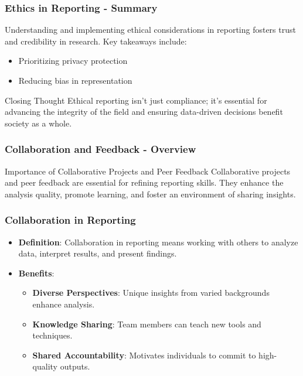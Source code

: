 \documentclass{beamer}
\begin{document}
\begin{frame}[fragile]
    \frametitle{Ethics in Reporting - Summary}
    Understanding and implementing ethical considerations in reporting fosters trust and credibility in research. 
    Key takeaways include:
    \begin{itemize}
        \item Prioritizing privacy protection
        \item Reducing bias in representation
    \end{itemize}
    \begin{block}{Closing Thought}
        Ethical reporting isn't just compliance; it's essential for advancing the integrity of the field and ensuring data-driven decisions benefit society as a whole.
    \end{block}
\end{frame}

\begin{frame}[fragile]
    \frametitle{Collaboration and Feedback - Overview}
    \begin{block}{Importance of Collaborative Projects and Peer Feedback}
        Collaborative projects and peer feedback are essential for refining reporting skills. They enhance the analysis quality, promote learning, and foster an environment of sharing insights.
    \end{block}
\end{frame}

\begin{frame}[fragile]
    \frametitle{Collaboration in Reporting}
    \begin{itemize}
        \item \textbf{Definition}: Collaboration in reporting means working with others to analyze data, interpret results, and present findings.
        \item \textbf{Benefits}:
        \begin{itemize}
            \item \textbf{Diverse Perspectives}: Unique insights from varied backgrounds enhance analysis.
            \item \textbf{Knowledge Sharing}: Team members can teach new tools and techniques.
            \item \textbf{Shared Accountability}: Motivates individuals to commit to high-quality outputs.
        \end{itemize}
    \end{itemize}
\end{frame}
\end{document}
